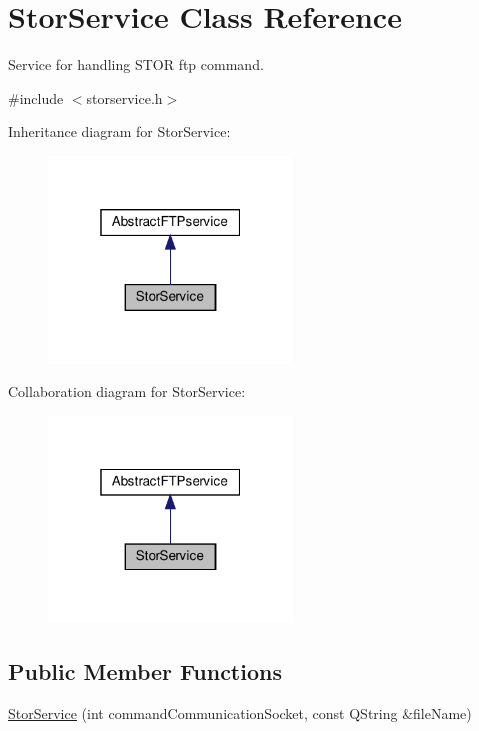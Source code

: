 \hypertarget{classStorService}{}\section{Stor\+Service Class Reference}
\label{classStorService}


Service for handling S\+T\+OR ftp command.  




{\ttfamily \#include $<$storservice.\+h$>$}



Inheritance diagram for Stor\+Service\+:\nopagebreak
\begin{figure}[H]
\begin{center}
\leavevmode
\includegraphics[width=184pt]{d9/d9f/classStorService__inherit__graph}
\end{center}
\end{figure}


Collaboration diagram for Stor\+Service\+:\nopagebreak
\begin{figure}[H]
\begin{center}
\leavevmode
\includegraphics[width=184pt]{dd/de2/classStorService__coll__graph}
\end{center}
\end{figure}
\subsection*{Public Member Functions}
\begin{DoxyCompactItemize}
\item 
\hyperlink{classStorService_a19cc8069d319617d264edadfbf20f37b}{Stor\+Service} (int command\+Communication\+Socket, const Q\+String \&file\+Name)
\end{DoxyCompactItemize}
